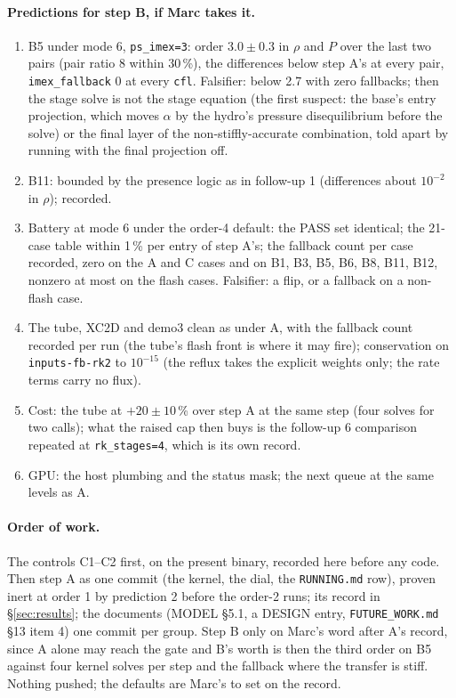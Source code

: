 \documentclass[11pt,a4paper]{article}
\newcommand{\code}[1]{\texttt{\small #1}}
\begin{document}
\paragraph{Predictions for step B, if Marc takes it.}
\begin{enumerate}[nosep]
\item B5 under mode 6, \code{ps\_imex=3}: order $3.0\pm0.3$ in $\rho$
      and $P$ over the last two pairs (pair ratio 8 within 30\,\%), the
      differences below step A's at every pair, \code{imex\_fallback} 0
      at every \code{cfl}.  Falsifier: below 2.7 with zero fallbacks;
      then the stage solve is not the stage equation (the first
      suspect: the base's entry projection, which moves $\alpha$ by the
      hydro's pressure disequilibrium before the solve) or the final
      layer of the non-stiffly-accurate combination, told apart by
      running with the final projection off.
\item B11: bounded by the presence logic as in follow-up 1 (differences
      about $10^{-2}$ in $\rho$); recorded.
\item Battery at mode 6 under the order-4 default: the PASS set
      identical; the 21-case table within 1\,\% per entry of step A's;
      the fallback count per case recorded, zero on the A and C cases
      and on B1, B3, B5, B6, B8, B11, B12, nonzero at most on the flash
      cases.  Falsifier: a flip, or a fallback on a non-flash case.
\item The tube, XC2D and demo3 clean as under A, with the fallback count
      recorded per run (the tube's flash front is where it may fire);
      conservation on \code{inputs-fb-rk2} to $10^{-15}$ (the reflux
      takes the explicit weights only; the rate terms carry no flux).
\item Cost: the tube at $+20\pm10$\,\% over step A at the same step
      (four solves for two calls); what the raised cap then buys is the
      follow-up 6 comparison repeated at \code{rk\_stages=4}, which is
      its own record.
\item GPU: the host plumbing and the status mask; the next queue at the
      same levels as A.
\end{enumerate}

\paragraph{Order of work.}  The controls C1--C2 first, on the present
binary, recorded here before any code.  Then step A as one commit
(the kernel, the dial, the \code{RUNNING.md} row), proven inert at
order 1 by prediction 2 before the order-2 runs; its record in
\S\ref{sec:results}; the documents (MODEL \S5.1, a DESIGN entry,
\code{FUTURE\_WORK.md} \S13 item 4) one commit per group.  Step B
only on Marc's word after A's record, since A alone may reach the
gate and B's worth is then the third order on B5 against four kernel
solves per step and the fallback where the transfer is stiff.  Nothing
pushed; the defaults are Marc's to set on the record.
\end{document}
